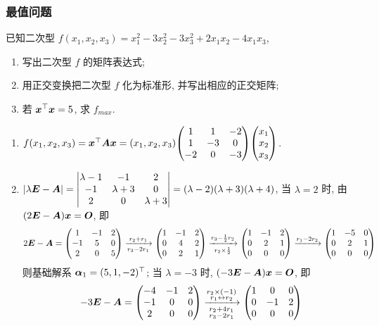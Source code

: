 \subsubsection{最值问题}

\begin{example}
    已知二次型 $f(x_1,x_2,x_3)=x_1^2-3x_2^2-3x_3^2+2x_1x_2-4x_1x_3$, 
    \begin{enumerate}[label=(\arabic{*})]
        \item 写出二次型 $f$ 的矩阵表达式;
        \item 用正交变换把二次型 $f$ 化为标准形, 并写出相应的正交矩阵;
        \item 若 $\vb*{x}^\top\vb*{x}=5$, 求 $f_{max}.$
    \end{enumerate}
\end{example}
\begin{solution}
    \begin{enumerate}[label=(\arabic{*})]
        \item $f(x_1,x_2,x_3)=\vb*{x}^\top\vb*{Ax}=(x_1,x_2,x_3)\mqty(1&1&-2\\1&-3&0\\-2&0&-3)\mqty(x_1\\x_2\\x_3)$.
        \item $|\lambda\vb*{E}-\vb*{A}|=\mqty|\lambda-1&-1&2\\-1&\lambda+3&0\\2&0&\lambda+3|=(\lambda-2)(\lambda+3)(\lambda+4)$, 当 $\lambda=2$ 时, 由 $(2\vb*{E}-\vb*{A})\vb*{x}=\vb*{O}$, 即
              $$2\vb*{E}-\vb*{A}=\mqty(1&-1&2\\-1&5&0\\2&0&5)\xrightarrow[r_3-2r_1]{r_2+r_1}\mqty(1&-1&2\\0&4&2\\0&2&1)\xrightarrow[r_2\times\frac{1}{2}]{r_3-\frac{1}{2}r_2}\mqty(1&-1&2\\0&2&1\\0&0&0)\xrightarrow{r_1-2r_2}\mqty(1&-5&0\\0&2&1\\0&0&0)$$
              则基础解系 $\vb*{\alpha}_1=(5,1,-2)^\top$; 当 $\lambda=-3$ 时, $(-3\vb*{E}-\vb*{A})\vb*{x}=\vb*{O}$, 即
              $$-3\vb*{E}-\vb*{A}=\mqty(-4&-1&2\\-1&0&0\\2&0&0)\xrightarrow[\substack{r_2+4r_1\\r_3-2r_1}]{\substack{r_2\times(-1)\\r_1\leftrightarrow r_2}}\mqty(1&0&0\\0&-1&2\\0&0&0)$$

\end{enumerate}
\end{solution}
